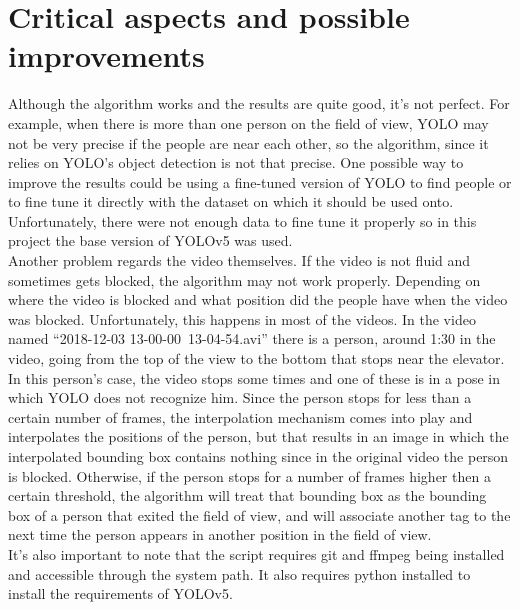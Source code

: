 \documentclass[conference]{IEEEtran}
\begin{document}
	\section{Critical aspects and possible improvements}
	
		Although the algorithm works and the results are quite good, it's not perfect. For example, when there is more than one person on the field of view,
		YOLO may not be very precise if the people are near each other, so the algorithm, since it relies on YOLO's object detection is not that precise. 
		One possible way to improve the results could be using a fine-tuned version of YOLO to find people or to fine tune it directly with the dataset on which 
		it should be used onto. Unfortunately, there were not enough data to fine tune it properly so in this project the base version of YOLOv5 was used.\\
		Another problem regards the video themselves. If the video is not fluid and sometimes gets blocked, the algorithm may not work properly.
		Depending on where the video is blocked and what position did the people have when the video was blocked. Unfortunately, this happens in most of the videos.
		In the video named ``2018-12-03 13-00-00~13-04-54.avi'' there is a person, around 1:30 in the video, going from the top of the view to the bottom that stops 
		near the elevator. In this person's case, the video stops some times and one of these is in a pose in which YOLO does not recognize him. Since the person 
		stops for less than a certain number of frames, the interpolation mechanism comes into play and interpolates the positions of the person, but that results 
		in an image in which the interpolated bounding box contains nothing since in the original video the person is blocked. Otherwise, if the person stops for a 
		number of frames higher then a certain threshold, the algorithm will treat that bounding box as the bounding box of a person that exited the field 
		of view, and will associate another tag to the next time the person appears in another position in the field of view.\\
		It's also important to note that the script requires git and ffmpeg being installed and accessible through the system path. It also requires python installed 
		to install the requirements of YOLOv5.
	
	\nocite{*}
	\printbibliography
\end{document}

